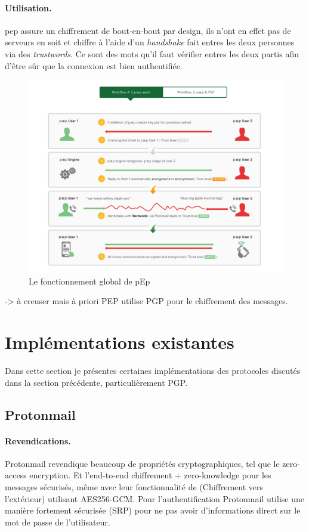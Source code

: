 \paragraph*{Utilisation.}
pep assure un chiffrement de bout-en-bout par design, ils n'ont en effet pas de serveurs en soit et chiffre à l'aide d'un \textit{handshake} fait entres les deux personnes via des \textit{trustwords}. Ce sont des mots qu'il faut vérifier entres les deux partis afin d'être sûr que la connexion est bien authentifiée.
\begin{figure}[h!]
    \includegraphics[width=15cm]{images/conceptualpEp.png}
    \centering
    \caption{Le fonctionnement global de pEp}
    \label{fig:PEP_global}
\end{figure}
-> à creuser mais à priori PEP utilise PGP pour le chiffrement des messages.

\section{Implémentations existantes}
Dans cette section je présentes certaines implémentations des protocoles discutés dans la section précédente, particulièrement PGP.
\subsection{Protonmail}
\paragraph*{Revendications.}
Protonmail revendique beaucoup de propriétés cryptographiques, tel que le zero-access encryption. Et l’end-to-end chiffrement + zero-knowledge pour les messages sécurisés, même avec leur fonctionnalité de (Chiffrement vers l'extérieur) utilisant AES256-GCM. 
Pour l'authentification Protonmail utilise une manière fortement sécurisée (SRP) pour ne pas avoir d'informations direct sur le mot de passe de l'utilisateur.
